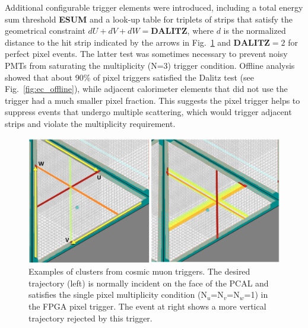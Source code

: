 Additional configurable trigger elements were introduced, including a total energy sum threshold \textbf{ESUM}
and a look-up table for triplets of strips that satisfy the geometrical constraint $dU+dV+dW=\textbf{DALITZ}$,
where $d$ is the normalized distance to the hit strip indicated by the arrows in Fig.~\ref{fig:pcal_cosmic_1} and
$\textbf{DALITZ}=2$ for perfect pixel events. The latter test was sometimes necessary to prevent noisy
PMTs from saturating the multiplicity (N=3) trigger condition. Offline analysis showed that about 90\% of
pixel triggers satisfied the Dalitz test (see Fig.~\ref{fig:ec_offline}), while adjacent calorimeter elements that
did not use the trigger had a much smaller pixel fraction.  This suggests the pixel trigger helps to suppress
events that undergo multiple scattering, which would trigger adjacent strips and violate the multiplicity
requirement.

\begin{figure}[!htb]
 	\centering
  	\includegraphics[width=0.95\columnwidth,keepaspectratio]{img/TwoClusters.png}
 	\caption{Examples of clusters from cosmic muon triggers.  The desired trajectory (left) is normally
          incident on the face of the PCAL and satisfies the single pixel multiplicity condition
          (N$_u$=N$_v$=N$_w$=1) in the FPGA pixel trigger. The event at right shows a more vertical trajectory
          rejected by this trigger.}
	\label{fig:pcal_cosmic_1}
\end{figure}

